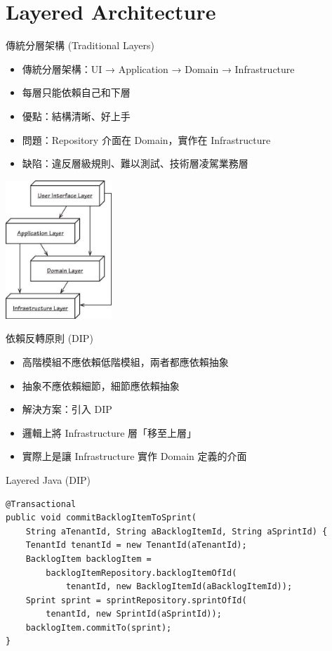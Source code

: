 \documentclass[UTF8]{beamer}
\begin{document}
\section{Layered Architecture}
\begin{frame}{傳統分層架構 (Traditional Layers)}
    \begin{itemize}
        \item 傳統分層架構：UI → Application → Domain → Infrastructure
        \item 每層只能依賴自己和下層
        \item 優點：結構清晰、好上手
        \item 問題：Repository 介面在 Domain，實作在 Infrastructure
        \item 缺陷：違反層級規則、難以測試、技術層凌駕業務層
    \end{itemize}
    \begin{center}
        \includegraphics[width=0.3\textwidth]{img/layered-basic.png}
    \end{center}
\end{frame}

\begin{frame}{依賴反轉原則 (DIP)}
    \begin{itemize}
        \item 高階模組不應依賴低階模組，兩者都應依賴抽象
        \item 抽象不應依賴細節，細節應依賴抽象
        \item 解決方案：引入 DIP
        \item 邏輯上將 Infrastructure 層「移至上層」
        \item 實際上是讓 Infrastructure 實作 Domain 定義的介面
    \end{itemize}
\end{frame}
\begin{frame}[fragile]{Layered Java (DIP)}
    \tiny
    \begin{lstlisting}
@Transactional
public void commitBacklogItemToSprint(
    String aTenantId, String aBacklogItemId, String aSprintId) {
    TenantId tenantId = new TenantId(aTenantId);
    BacklogItem backlogItem =
        backlogItemRepository.backlogItemOfId(
            tenantId, new BacklogItemId(aBacklogItemId));
    Sprint sprint = sprintRepository.sprintOfId(
        tenantId, new SprintId(aSprintId));
    backlogItem.commitTo(sprint);
}
\end{lstlisting}
\end{frame}
\end{document}
